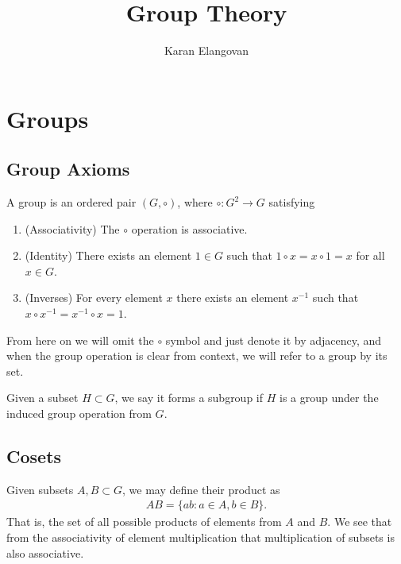 \documentclass[]{article}
\title{Group Theory}
\author{Karan Elangovan}
\begin{document}
\maketitle

\doublespacing
\tableofcontents

\section{Groups}

\subsection{Group Axioms}

\begin{defi} [Group]
		A group is an ordered pair $(G, \circ)$, where $\circ: G^2 \to G$ satisfying
		\begin{enumerate}
				\item (Associativity) The $\circ$ operation is associative.
				\item (Identity) There exists an element $1 \in G$ such that $1 \circ x = x \circ 1 = x$ for all $x \in G$.
				\item (Inverses) For every element $x$ there exists an element $x^{-1}$ such that $x \circ x^{-1} = x^{-1} \circ x = 1$.
		\end{enumerate}
\end{defi}

From here on we will omit the $\circ$ symbol and just denote it by adjacency, and when the group operation is clear from context, we will refer to a group by its set.

\begin{defi} [Subgroup]
	Given a subset $H \subset G$, we say it forms a subgroup if $H$ is a group under the induced group operation from $G$.
\end{defi}

\subsection{Cosets}

Given subsets $A, B \subset G$, we may define their product as
\begin{align*}
		AB = \{ab : a \in A, b \in B\}.
\end{align*}
That is, the set of all possible products of elements from $A$ and $B$. We see that from the associativity of element multiplication that multiplication of subsets is also associative.
\end{document}
